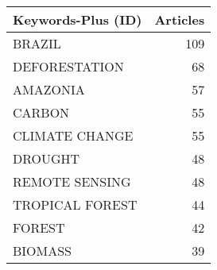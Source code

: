 
\begin{tabular}{lr}
\toprule
Keywords-Plus (ID) & Articles\\
\midrule
BRAZIL & 109\\
DEFORESTATION & 68\\
AMAZONIA & 57\\
CARBON & 55\\
CLIMATE CHANGE & 55\\
\addlinespace
DROUGHT & 48\\
REMOTE SENSING & 48\\
TROPICAL FOREST & 44\\
FOREST & 42\\
BIOMASS & 39\\
\bottomrule
\end{tabular}